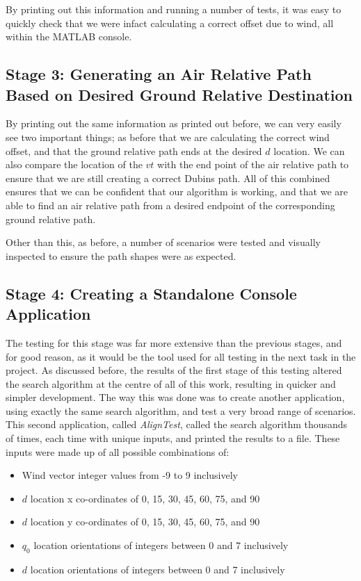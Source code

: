 By printing out this information and running a number of tests, it was easy to quickly check that we were infact calculating a correct offset due to wind, all within the MATLAB console. 

\subsection{Stage 3: Generating an Air Relative Path Based on Desired Ground Relative Destination}
\label{task1:testing:stage3}

By printing out the same information as printed out before, we can very easily see two important things; as before that we are calculating the correct wind offset, and that the ground relative path ends at the desired $d$ location. We can also compare the location of the $vt$ with the end point of the air relative path to ensure that we are still creating a correct Dubins path. All of this combined ensures that we can be confident that our algorithm is working, and that we are able to find an air relative path from a desired endpoint of the corresponding ground relative path. 

Other than this, as before, a number of scenarios were tested and visually inspected to ensure the path shapes were as expected.

\subsection{Stage 4: Creating a Standalone Console Application}
\label{task1:testing:stage4}

The testing for this stage was far more extensive than the previous stages, and for good reason, as it would be the tool used for all testing in the next task in the project. As discussed before, the results of the first stage of this testing altered the search algorithm at the centre of all of this work, resulting in quicker and simpler development. The way this was done was to create another application, using exactly the same search algorithm, and test a very broad range of scenarios. This second application, called \textit{AlignTest}, called the search algorithm thousands of times, each time with unique inputs, and printed the results to a file. These inputs were made up of all possible combinations of:

\begin{itemize}
	\item Wind vector integer values from -9 to 9 inclusively
	\item $d$ location x co-ordinates of 0, 15, 30, 45, 60, 75, and 90
	\item $d$ location y co-ordinates of 0, 15, 30, 45, 60, 75, and 90
	\item $q_0$ location orientations of integers between 0 and 7 inclusively
	\item $d$ location orientations of integers between 0 and 7 inclusively
\end{itemize}


